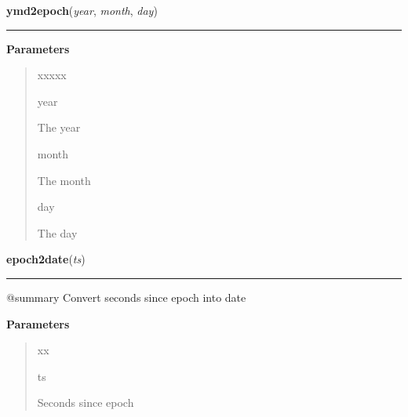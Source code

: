 \hspace{.8\funcindent}\begin{boxedminipage}{\funcwidth}

    \raggedright \textbf{ymd2epoch}(\textit{year}, \textit{month}, \textit{day})

    \vspace{-1.5ex}

    \rule{\textwidth}{0.5\fboxrule}
\setlength{\parskip}{2ex}
\setlength{\parskip}{1ex}
      \textbf{Parameters}
      \vspace{-1ex}

      \begin{quote}
        \begin{Ventry}{xxxxx}

          \item[year]

          The year

          \item[month]

          The month

          \item[day]

          The day

        \end{Ventry}

      \end{quote}

    \end{boxedminipage}

    \label{QSTK:qstkutil:dateutil:epoch2date}

    \vspace{0.5ex}

\hspace{.8\funcindent}\begin{boxedminipage}{\funcwidth}

    \raggedright \textbf{epoch2date}(\textit{ts})

    \vspace{-1.5ex}

    \rule{\textwidth}{0.5\fboxrule}
\setlength{\parskip}{2ex}
    @summary Convert seconds since epoch into date

\setlength{\parskip}{1ex}
      \textbf{Parameters}
      \vspace{-1ex}

      \begin{quote}
        \begin{Ventry}{xx}

          \item[ts]

          Seconds since epoch

        \end{Ventry}

      \end{quote}

    \end{boxedminipage}


